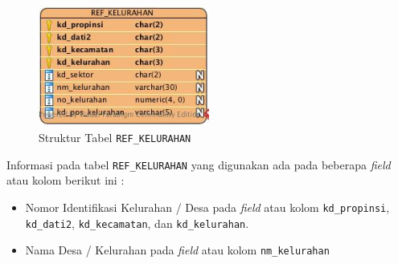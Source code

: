 \begin{figure}[H]
	\centering
	\includegraphics[width=0.5\textwidth]{./resources/struktur-tabel-ref-kel}
	\caption{Struktur Tabel \texttt{REF\_KELURAHAN}}
	\label{fig:struktur-ref-kel}
\end{figure}

Informasi pada tabel \texttt{REF\_KELURAHAN} yang digunakan ada pada beberapa \textit{field} atau kolom berikut ini :

\begin{itemize}
	\item Nomor Identifikasi Kelurahan / Desa pada \textit{field} atau kolom \texttt{kd\_propinsi}, \texttt{kd\_dati2}, \texttt{kd\_kecamatan}, dan \texttt{kd\_kelurahan}.
	\item Nama Desa / Kelurahan pada \textit{field} atau kolom \texttt{nm\_kelurahan}
\end{itemize}